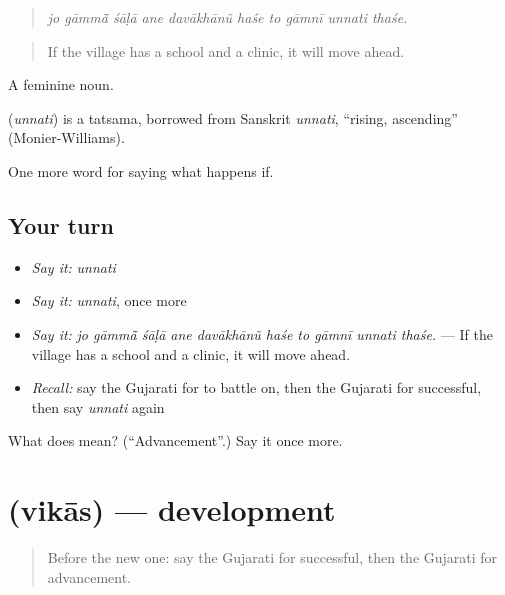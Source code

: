 \begin{quote}
\emph{jo gāmmā̃ śāḷā ane davākhānũ haśe to gāmnī unnati thaśe.}
\end{quote}

\begin{quote}
If the village has a school and a clinic, it will move ahead.
\end{quote}

A feminine noun.

\begin{cousinweb}
\textbf{} (\emph{unnati}) is a tatsama, borrowed from Sanskrit \emph{unnati}, \textquotedblleft{}rising, ascending\textquotedblright{} (Monier-Williams).
\end{cousinweb}

\begin{grammarlens}[title={What you've built}]
One more word for saying what happens if.
\end{grammarlens}

\subsection*{Your turn}
\begin{itemize}
\raggedright
  \item \emph{Say it:} \emph{unnati}
  \item \emph{Say it:} \emph{unnati}, once more
  \item \emph{Say it:} \emph{jo gāmmā̃ śāḷā ane davākhānũ haśe to gāmnī unnati thaśe.} — If the village has a school and a clinic, it will move ahead.
  \item \emph{Recall:} say the Gujarati for to battle on, then the Gujarati for successful, then say \emph{unnati} again
\end{itemize}

\begin{tcolorbox}[breakable,colback=teal!4,colframe=teal!35!black,title={Before you move on}]
What does  mean? (\textquotedblleft{}Advancement\textquotedblright{}.) Say it once more.
\end{tcolorbox}
\section[\texorpdfstring{\gu{વિકાસ} (vikās)}{વિકાસ (vikās)}]{ (vikās) — development}

\label{lesson:GU-C384-vikas}



\begin{quote}
Before the new one: say the Gujarati for successful, then the Gujarati for advancement.
\end{quote}

